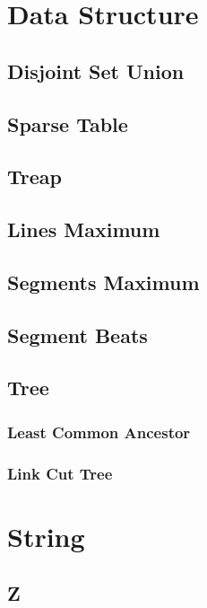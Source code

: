 \documentclass{article}
\begin{document}
\begin{multicols}{3}
    \section{Data Structure}
    \subsection{Disjoint Set Union}
    
    \subsection{Sparse Table}
    
    \subsection{Treap}
    
    \subsection{Lines Maximum}
    
    \subsection{Segments Maximum}
    
    \subsection{Segment Beats}
    
    \subsection{Tree}
    \subsubsection{Least Common Ancestor}
    
    \subsubsection{Link Cut Tree}
    


    \section{String}
    \subsection{Z}
    

\end{multicols}
\end{document}
